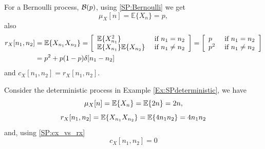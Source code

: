 \begin{example}
\label{Ex:BinaryRandom2}

For a Bernoulli process, ${\cal B}(p)$, using \eqref{SP:Bernoulli} we get
\begin{equation}
\mu_X[n] = \mathbb{E}\{X_n\} = p,
\label{ec:Mean_b}
\end{equation}
also 
\begin{align}
r_X[n_1,n_2] 
	&= \mathbb{E}\{X_{n_1}X_{n_2}\}
     = \left[\begin{array}{ll}
        \mathbb{E}\{X_{n_1}^2\}              & \mbox{ if } n_1 = n_2 \\
        \mathbb{E}\{X_{n_1}\} \mathbb{E}\{X_{n_2}\} & \mbox{ if } n_1\neq n_2
       \end{array}
      \right]
     = \left[\begin{array}{ll}
        p   & \mbox{ if } n_1 = n_2 \\
        p^2 & \mbox{ if } n_1\neq n_2
      \end{array}
    \right]    \nonumber\\
    &= p^2 + p(1-p) \delta[n_1-n_2]
\label{ec:r_b}
\end{align}
and $c_X[n_1,n_2] = r_X[n_1, n_2]$.

\end{example}

\begin{example}
\label{Ex:SPdeterministic2}

Consider the deterministic process in Example \ref{Ex:SPdeterministic}, we have
\begin{equation}
\mu_X[n] = \mathbb{E}\{X_n\} = \mathbb{E}\{2n\} = 2n,
\end{equation}
\begin{equation}
r_X[n_1,n_2] = \mathbb{E}\{X_{n_1} X_{n_2}\} = \mathbb{E}\{4 n_1 n_2\} = 4 n_1 n_2
\label{RxDeterministic}
\end{equation}
and, using \eqref{SP:cx_vs_rx}
\begin{equation}
c_X[n_1,n_2] = 0
\label{CxDeterministic}
\end{equation}

\end{example}


